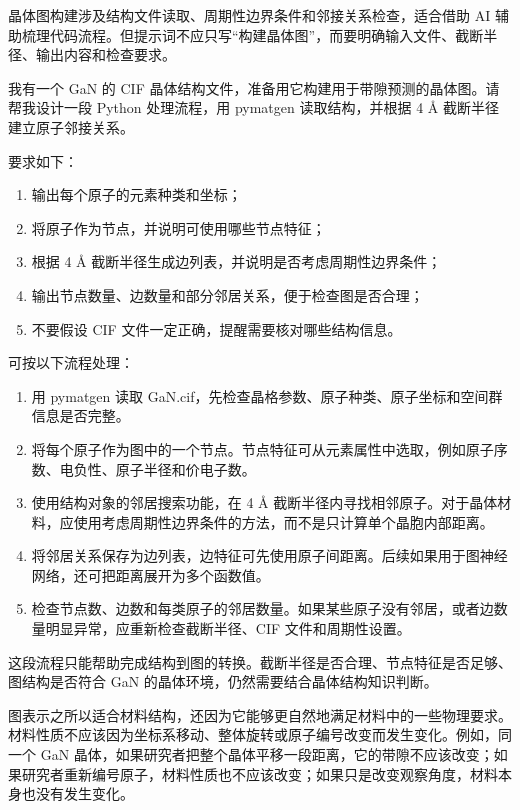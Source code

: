 晶体图构建涉及结构文件读取、周期性边界条件和邻接关系检查，适合借助 AI 辅助梳理代码流程。但提示词不应只写“构建晶体图”，而要明确输入文件、截断半径、输出内容和检查要求。

\begin{samepage}
\begin{userbox}
我有一个 GaN 的 CIF 晶体结构文件，准备用它构建用于带隙预测的晶体图。请帮我设计一段 Python 处理流程，用 pymatgen 读取结构，并根据 4 \AA{} 截断半径建立原子邻接关系。

要求如下：
\begin{enumerate}
\item 输出每个原子的元素种类和坐标；
\item 将原子作为节点，并说明可使用哪些节点特征；
\item 根据 4 \AA{} 截断半径生成边列表，并说明是否考虑周期性边界条件；
\item 输出节点数量、边数量和部分邻居关系，便于检查图是否合理；
\item 不要假设 CIF 文件一定正确，提醒需要核对哪些结构信息。
\end{enumerate}
\end{userbox}

\begin{aibox}
可按以下流程处理：

\begin{enumerate}
\item 用 pymatgen 读取 GaN.cif，先检查晶格参数、原子种类、原子坐标和空间群信息是否完整。
\item 将每个原子作为图中的一个节点。节点特征可从元素属性中选取，例如原子序数、电负性、原子半径和价电子数。
\item 使用结构对象的邻居搜索功能，在 4 \AA{} 截断半径内寻找相邻原子。对于晶体材料，应使用考虑周期性边界条件的方法，而不是只计算单个晶胞内部距离。
\item 将邻居关系保存为边列表，边特征可先使用原子间距离。后续如果用于图神经网络，还可把距离展开为多个函数值。
\item 检查节点数、边数和每类原子的邻居数量。如果某些原子没有邻居，或者边数量明显异常，应重新检查截断半径、CIF 文件和周期性设置。
\end{enumerate}

这段流程只能帮助完成结构到图的转换。截断半径是否合理、节点特征是否足够、图结构是否符合 GaN 的晶体环境，仍然需要结合晶体结构知识判断。
\end{aibox}
\end{samepage}

图表示之所以适合材料结构，还因为它能够更自然地满足材料中的一些物理要求。材料性质不应该因为坐标系移动、整体旋转或原子编号改变而发生变化。例如，同一个 GaN 晶体，如果研究者把整个晶体平移一段距离，它的带隙不应该改变；如果研究者重新编号原子，材料性质也不应该改变；如果只是改变观察角度，材料本身也没有发生变化。


